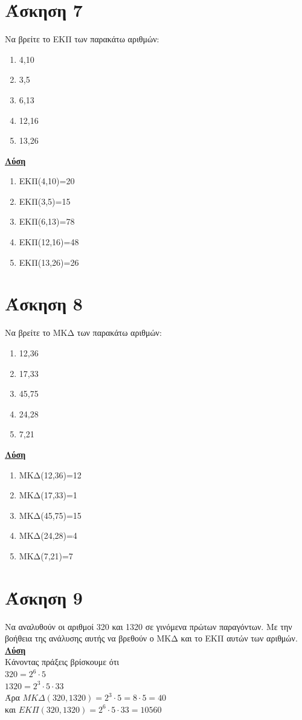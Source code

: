 \documentclass[a4paper,10pt]{report}
\begin{document}
\section*{Άσκηση 7  \hfill \small{}}
Να βρείτε το ΕΚΠ των παρακάτω αριθμών: 
\begin{enumerate}[1)]
 \item 4,10
 \item 3,5
 \item 6,13
 \item 12,16
 \item 13,26
\end{enumerate}
\underline{\textbf{Λύση}}\\
\begin{enumerate}[1)]
 \item ΕΚΠ(4,10)=20
 \item ΕΚΠ(3,5)=15
 \item ΕΚΠ(6,13)=78
 \item ΕΚΠ(12,16)=48
 \item ΕΚΠ(13,26)=26
\end{enumerate}


\section*{Άσκηση 8  \hfill \small{}}
Να βρείτε το ΜΚΔ των παρακάτω αριθμών: 
\begin{enumerate}[1)]
 \item 12,36
 \item 17,33
 \item 45,75
 \item 24,28
 \item 7,21
\end{enumerate}
\underline{\textbf{Λύση}}\\
\begin{enumerate}[1)]
 \item ΜΚΔ(12,36)=12
 \item ΜΚΔ(17,33)=1
 \item ΜΚΔ(45,75)=15
 \item ΜΚΔ(24,28)=4
 \item ΜΚΔ(7,21)=7
\end{enumerate}


\section*{Άσκηση 9  \hfill \small{}}
Να αναλυθούν οι αριθμοί 320 και 1320 σε γινόμενα πρώτων παραγόντων. Με την βοήθεια της ανάλυσης αυτής να βρεθούν 
ο ΜΚΔ και το ΕΚΠ αυτών των αριθμών.\\
\underline{\textbf{Λύση}}\\
Κάνοντας πράξεις βρίσκουμε ότι \\
$320=2^{6}\cdot5$\\
$1320=2^{3}\cdot5\cdot33$\\
Άρα $ΜΚΔ(320,1320)=2^{3}\cdot5 =8\cdot5=40$\\
και $ΕΚΠ(320,1320)=2^{6}\cdot5\cdot33=10560$
\end{document}
